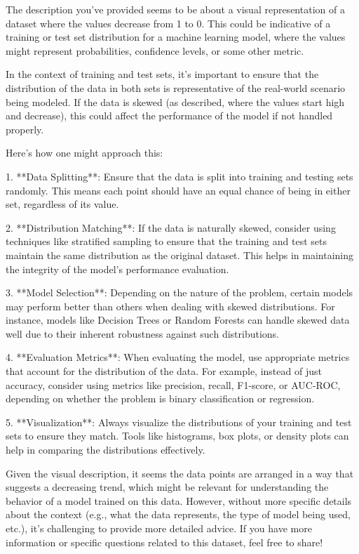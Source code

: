 The description you've provided seems to be about a visual representation of a dataset where the values decrease from 1 to 0. This could be indicative of a training or test set distribution for a machine learning model, where the values might represent probabilities, confidence levels, or some other metric.

In the context of training and test sets, it's important to ensure that the distribution of the data in both sets is representative of the real-world scenario being modeled. If the data is skewed (as described, where the values start high and decrease), this could affect the performance of the model if not handled properly.

Here’s how one might approach this:

1. **Data Splitting**: Ensure that the data is split into training and testing sets randomly. This means each point should have an equal chance of being in either set, regardless of its value.

2. **Distribution Matching**: If the data is naturally skewed, consider using techniques like stratified sampling to ensure that the training and test sets maintain the same distribution as the original dataset. This helps in maintaining the integrity of the model's performance evaluation.

3. **Model Selection**: Depending on the nature of the problem, certain models may perform better than others when dealing with skewed distributions. For instance, models like Decision Trees or Random Forests can handle skewed data well due to their inherent robustness against such distributions.

4. **Evaluation Metrics**: When evaluating the model, use appropriate metrics that account for the distribution of the data. For example, instead of just accuracy, consider using metrics like precision, recall, F1-score, or AUC-ROC, depending on whether the problem is binary classification or regression.

5. **Visualization**: Always visualize the distributions of your training and test sets to ensure they match. Tools like histograms, box plots, or density plots can help in comparing the distributions effectively.

Given the visual description, it seems the data points are arranged in a way that suggests a decreasing trend, which might be relevant for understanding the behavior of a model trained on this data. However, without more specific details about the context (e.g., what the data represents, the type of model being used, etc.), it's challenging to provide more detailed advice. If you have more information or specific questions related to this dataset, feel free to share!